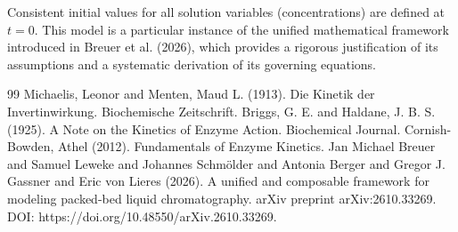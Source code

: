 \documentclass{article}
\begin{document}
Consistent initial values for all solution variables (concentrations) are defined at $t = 0$.
This model is a particular instance of the unified mathematical framework introduced in Breuer et al. (2026), which provides a rigorous justification of its assumptions and a systematic derivation of its governing equations.
\begin{thebibliography}{99}
     Michaelis, Leonor and Menten, Maud L. (1913). Die Kinetik der Invertinwirkung. Biochemische Zeitschrift.
     Briggs, G. E. and Haldane, J. B. S. (1925). A Note on the Kinetics of Enzyme Action. Biochemical Journal.
     Cornish-Bowden, Athel (2012). Fundamentals of Enzyme Kinetics.
     Jan Michael Breuer and Samuel Leweke and Johannes Schmölder and Antonia Berger and Gregor J. Gassner and Eric von Lieres (2026). A unified and composable framework for modeling packed-bed liquid chromatography. arXiv preprint arXiv:2610.33269. DOI: https://doi.org/10.48550/arXiv.2610.33269.
\end{thebibliography}
\end{document}
